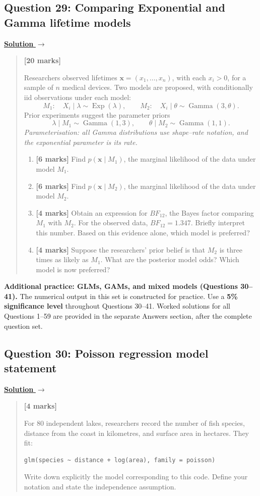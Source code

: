 \documentclass[11pt,a4paper]{article}
\newcommand{\xvec}{\boldsymbol{x}}
\newenvironment{examquestion}[2]
  {\subsection{#1}\label{question:\arabic{subsection}}\label{#2}%
   \noindent\hyperref[answer:\arabic{subsection}]{\textbf{Solution} $\rightarrow$}%
   \begin{quote}\color{statgrey}}
  {\end{quote}}
\begin{document}
\begin{examquestion}{Question 29: Comparing Exponential and Gamma lifetime models}{question:practice-comparing-exponential-and-gamma-lifetime-models}
\textbf{[20 marks]}

Researchers observed lifetimes $\xvec=(x_1,\ldots,x_n)$, with each $x_i>0$,
for a sample of $n$ medical devices. Two models are proposed, with
conditionally iid observations under each model:
\[
M_1:\quad X_i\mid\lambda\sim\operatorname{Exp}(\lambda),
\qquad
M_2:\quad X_i\mid\theta\sim\operatorname{Gamma}(3,\theta).
\]
Prior experiments suggest the parameter priors
\[
\lambda\mid M_1\sim\operatorname{Gamma}(1,3),
\qquad
\theta\mid M_2\sim\operatorname{Gamma}(1,1).
\]
\emph{Parameterisation: all Gamma distributions use shape--rate notation,
and the exponential parameter is its rate.}

\begin{enumerate}[label=(\roman*)]
  \item \textbf{[6 marks]} Find $p(\xvec\mid M_1)$, the marginal
        likelihood of the data under model $M_1$.
  \item \textbf{[6 marks]} Find $p(\xvec\mid M_2)$, the marginal
        likelihood of the data under model $M_2$.
  \item \textbf{[4 marks]} Obtain an expression for $BF_{12}$, the Bayes
        factor comparing $M_1$ with $M_2$. For the observed data,
        $BF_{12}=1.347$. Briefly interpret this number. Based on this
        evidence alone, which model is preferred?
  \item \textbf{[4 marks]} Suppose the researchers' prior belief is that
        $M_2$ is three times as likely as $M_1$. What are the posterior
        model odds? Which model is now preferred?
\end{enumerate}
\end{examquestion}

\clearpage

\textbf{Additional practice: GLMs, GAMs, and mixed models (Questions 30--41).}
The numerical output in this set is constructed for practice. Use a
\textbf{5\% significance level} throughout Questions 30--41. Worked solutions
for all Questions 1--59 are provided in the separate Answers section, after the
complete question set.

\begin{examquestion}{Question 30: Poisson regression model statement}{question:practice-poisson-regression-model-statement}
\textbf{[4 marks]}

For 80 independent lakes, researchers record the number of fish species,
distance from the coast in kilometres, and surface area in hectares. They fit:
\begin{verbatim}
glm(species ~ distance + log(area), family = poisson)
\end{verbatim}
Write down explicitly the model corresponding to this code. Define your
notation and state the independence assumption.
\end{examquestion}
\end{document}
